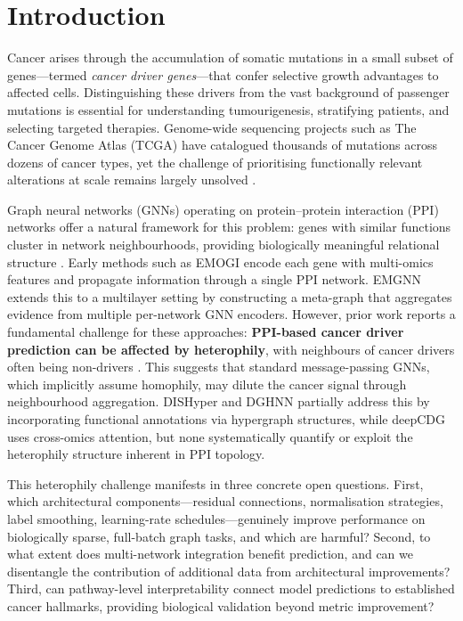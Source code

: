 
\section{Introduction}

Cancer arises through the accumulation of somatic mutations in a small
subset of genes---termed \textit{cancer driver genes}---that confer selective
growth advantages to affected cells. Distinguishing these drivers from the vast
background of passenger mutations is essential for understanding tumourigenesis,
stratifying patients, and selecting targeted therapies. Genome-wide sequencing
projects such as The Cancer Genome Atlas (TCGA) have catalogued thousands of
mutations across dozens of cancer types, yet the challenge of prioritising
functionally relevant alterations at scale remains largely unsolved
\cite{emogi2021,emgnn2023}.

Graph neural networks (GNNs) operating on protein--protein interaction (PPI)
networks offer a natural framework for this problem: genes with similar functions
cluster in network neighbourhoods, providing biologically meaningful relational
structure \cite{gcn2017}. Early methods such as EMOGI \cite{emogi2021} encode
each gene with multi-omics features and propagate information through a single
PPI network. EMGNN \cite{emgnn2023} extends this to a multilayer setting by
constructing a meta-graph that aggregates evidence from multiple per-network GNN
encoders. However, prior work reports a fundamental challenge for these
approaches: \textbf{PPI-based cancer driver prediction can be affected by
heterophily}, with neighbours of cancer drivers often being non-drivers
\cite{sgcd2024}. This suggests that standard message-passing GNNs, which
implicitly assume homophily, may dilute the cancer signal through neighbourhood
aggregation.
DISHyper \cite{dishyper2024} and DGHNN \cite{dghnn2025} partially address this
by incorporating functional annotations via hypergraph structures, while
deepCDG \cite{deepcdg2025} uses cross-omics attention, but none systematically
quantify or exploit the heterophily structure inherent in PPI topology.

This heterophily challenge manifests in three concrete open questions. First,
which architectural components---residual connections, normalisation strategies,
label smoothing, learning-rate schedules---genuinely improve performance on
biologically sparse, full-batch graph tasks, and which are harmful? Second, to
what extent does multi-network integration benefit prediction, and can we
disentangle the contribution of additional data from architectural improvements?
Third, can pathway-level interpretability connect model predictions to
established cancer hallmarks, providing biological validation beyond metric
improvement?

